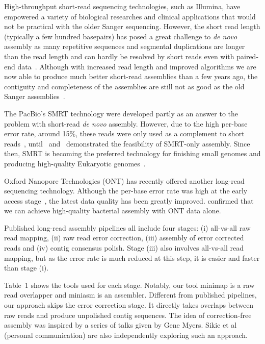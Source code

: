 \documentclass{bioinfo}
\begin{document}
High-throughput short-read sequencing technologies, such as Illumina, have
empowered a variety of biological researches and clinical applications that
would not be practical with the older Sanger sequencing. However, the short
read length (typically a few hundred basepairs) has posed a great challenge to
\emph{de novo} assembly as many repetitive sequences and segmental duplications
are longer than the read length and can hardly be resolved by short reads even
with paired-end data~\citep{Alkan:2011zr}. Although with increased read length
and improved algorithms we are now able to produce much better short-read
assemblies than a few years ago, the contiguity and completeness of the
assemblies are still not as good as the old Sanger
assemblies~\citep{Chaisson:2015wj}.

The PacBio's SMRT technology were developed partly as an answer to the
problem with short-read \emph{de novo} assembly. However, due to the high
per-base error rate, around 15\%, these reads were only used as a complement to
short reads~\citep{Bashir:2012gb,Ribeiro:2012bx,Koren:2012pt},
until~\citet{Chin:2013qr} and~\citet{Koren:2013fc} demonstrated the feasibility
of SMRT-only assembly. Since then, SMRT is becoming the preferred technology
for finishing small genomes and producing high-quality Eukaryotic
genomes~\citep{Berlin:2015xy}.

Oxford Nanopore Technologies (ONT) has recently offered another long-read
sequencing technology. Although the per-base error rate was high at the
early access stage~\citep{Quick:2014uf}, the latest data quality has been
greatly improved. \citet{Loman:2015xu} confirmed that we can achieve
high-quality bacterial assembly with ONT data alone.

Published long-read assembly pipelines all include four stages: (i) all-vs-all
raw read mapping, (ii) raw read error correction, (iii) assembly of error
corrected reads and (iv) contig consensus polish. Stage (iii) also involves
all-vs-all read mapping, but as the error rate is much reduced at this step,
it is easier and faster than stage (i).

Table~1 shows the tools used for each stage. Notably, our tool
minimap is a raw read overlapper and miniasm is an assembler. Different from
published pipelines, our approach skips the error correction stage.  It
directly takes overlaps between raw reads and produce unpolished contig
sequences. The idea of correction-free assembly was inspired by a series of
talks given by Gene Myers. Sikic et al (personal communication) are also
independently exploring such an approach.
\end{document}
